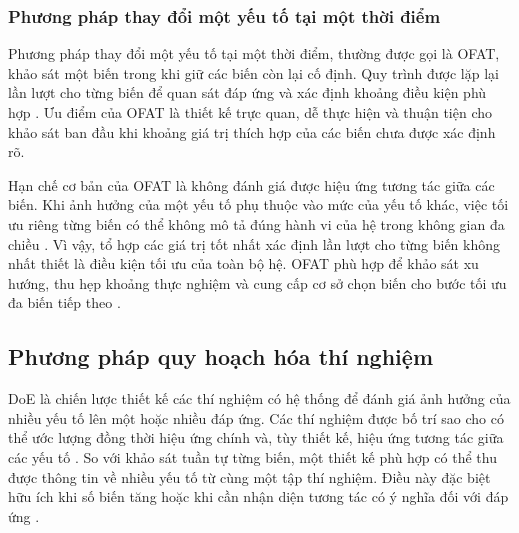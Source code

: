 \subsubsection{Phương pháp thay đổi một yếu tố tại một thời điểm}
Phương pháp thay đổi một yếu tố tại một thời điểm, thường được gọi là OFAT, khảo sát một biến trong khi giữ các biến còn lại cố định.
Quy trình được lặp lại lần lượt cho từng biến để quan sát đáp ứng và xác định khoảng điều kiện phù hợp \parencite{bezerra2008}.
Ưu điểm của OFAT là thiết kế trực quan, dễ thực hiện và thuận tiện cho khảo sát ban đầu khi khoảng giá trị thích hợp của các biến chưa được xác định rõ.
\par
Hạn chế cơ bản của OFAT là không đánh giá được hiệu ứng tương tác giữa các biến.
Khi ảnh hưởng của một yếu tố phụ thuộc vào mức của yếu tố khác, việc tối ưu riêng từng biến có thể không mô tả đúng hành vi của hệ trong không gian đa chiều \parencite{bezerra2008,montgomery2017}.
Vì vậy, tổ hợp các giá trị tốt nhất xác định lần lượt cho từng biến không nhất thiết là điều kiện tối ưu của toàn bộ hệ.
OFAT phù hợp để khảo sát xu hướng, thu hẹp khoảng thực nghiệm và cung cấp cơ sở chọn biến cho bước tối ưu đa biến tiếp theo \parencite{bezerra2008}.

\subsection{Phương pháp quy hoạch hóa thí nghiệm}
DoE là chiến lược thiết kế các thí nghiệm có hệ thống để đánh giá ảnh hưởng của nhiều yếu tố lên một hoặc nhiều đáp ứng.
Các thí nghiệm được bố trí sao cho có thể ước lượng đồng thời hiệu ứng chính và, tùy thiết kế, hiệu ứng tương tác giữa các yếu tố \parencite{montgomery2017}.
So với khảo sát tuần tự từng biến, một thiết kế phù hợp có thể thu được thông tin về nhiều yếu tố từ cùng một tập thí nghiệm.
Điều này đặc biệt hữu ích khi số biến tăng hoặc khi cần nhận diện tương tác có ý nghĩa đối với đáp ứng \parencite{montgomery2017}.

